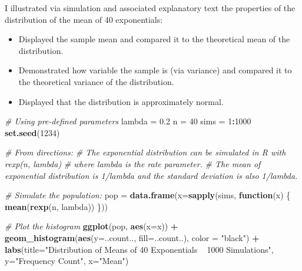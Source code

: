 \documentclass[]{article}
\newenvironment{Shaded}{\begin{snugshade}}{\end{snugshade}}
\newcommand{\KeywordTok}[1]{\textcolor[rgb]{0.13,0.29,0.53}{\textbf{#1}}}
\newcommand{\DataTypeTok}[1]{\textcolor[rgb]{0.13,0.29,0.53}{#1}}
\newcommand{\DecValTok}[1]{\textcolor[rgb]{0.00,0.00,0.81}{#1}}
\newcommand{\FloatTok}[1]{\textcolor[rgb]{0.00,0.00,0.81}{#1}}
\newcommand{\StringTok}[1]{\textcolor[rgb]{0.31,0.60,0.02}{#1}}
\newcommand{\CommentTok}[1]{\textcolor[rgb]{0.56,0.35,0.01}{\textit{#1}}}
\newcommand{\ControlFlowTok}[1]{\textcolor[rgb]{0.13,0.29,0.53}{\textbf{#1}}}
\newcommand{\OperatorTok}[1]{\textcolor[rgb]{0.81,0.36,0.00}{\textbf{#1}}}
\newcommand{\NormalTok}[1]{#1}
\providecommand{\tightlist}{%
  \setlength{\itemsep}{0pt}\setlength{\parskip}{0pt}}
\begin{document}
I illustrated via simulation and associated explanatory text the
properties of the distribution of the mean of 40 exponentials:

\begin{itemize}
\tightlist
\item
  Displayed the sample mean and compared it to the theoretical mean of
  the distribution.
\item
  Demonstrated how variable the sample is (via variance) and compared it
  to the theoretical variance of the distribution.
\item
  Displayed that the distribution is approximately normal.
\end{itemize}

\begin{Shaded}
\begin{Highlighting}[]
        \CommentTok{# Using pre-defined parameters}
\NormalTok{        lambda =}\StringTok{ }\FloatTok{0.2}
\NormalTok{        n =}\StringTok{ }\DecValTok{40}
\NormalTok{        sims =}\StringTok{ }\DecValTok{1}\OperatorTok{:}\DecValTok{1000}
        \KeywordTok{set.seed}\NormalTok{(}\DecValTok{1234}\NormalTok{)}

        
        \CommentTok{# From directions: }
        \CommentTok{# The exponential distribution can be simulated in R with rexp(n, lambda) }
        \CommentTok{# where lambda is the rate parameter. }
        \CommentTok{# The mean of exponential distribution is 1/lambda and the standard deviation is also 1/lambda.}
        
        \CommentTok{# Simulate the population:}
\NormalTok{        pop =}\StringTok{ }\KeywordTok{data.frame}\NormalTok{(}\DataTypeTok{x=}\KeywordTok{sapply}\NormalTok{(sims, }\ControlFlowTok{function}\NormalTok{(x) \{}
                \KeywordTok{mean}\NormalTok{(}\KeywordTok{rexp}\NormalTok{(n, lambda))}
\NormalTok{        \}))}
\end{Highlighting}
\end{Shaded}

\begin{Shaded}
\begin{Highlighting}[]
        \CommentTok{# Plot the histogram}
        \KeywordTok{ggplot}\NormalTok{(pop, }\KeywordTok{aes}\NormalTok{(}\DataTypeTok{x=}\NormalTok{x)) }\OperatorTok{+}
\StringTok{                }\KeywordTok{geom_histogram}\NormalTok{(}\KeywordTok{aes}\NormalTok{(}\DataTypeTok{y=}\NormalTok{..count.., }\DataTypeTok{fill=}\NormalTok{..count..), }
                               \DataTypeTok{color =} \StringTok{"black"}\NormalTok{) }\OperatorTok{+}\StringTok{ }
\StringTok{                }\KeywordTok{labs}\NormalTok{(}\DataTypeTok{title=}\StringTok{"Distribution of Means of 40 Exponentials ~ 1000 Simulations"}\NormalTok{, }
                     \DataTypeTok{y=}\StringTok{"Frequency Count"}\NormalTok{, }\DataTypeTok{x=}\StringTok{"Mean"}\NormalTok{)}
\end{Highlighting}
\end{Shaded}
\end{document}
